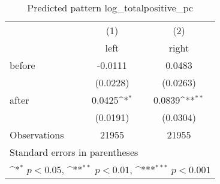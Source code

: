 \begin{table}[htbp]\centering
\def\sym#1{\ifmmode^{#1}\else\(^{#1}\)\fi}
\caption{Predicted pattern log\_totalpositive\_pc}
\begin{tabular}{l*{2}{c}}
\hline\hline
                    &\multicolumn{1}{c}{(1)}&\multicolumn{1}{c}{(2)}\\
                    &\multicolumn{1}{c}{left}&\multicolumn{1}{c}{right}\\
\hline
before              &     -0.0111         &      0.0483         \\
                    &    (0.0228)         &    (0.0263)         \\
[1em]
after               &      0.0425\sym{*}  &      0.0839\sym{**} \\
                    &    (0.0191)         &    (0.0304)         \\
\hline
Observations        &       21955         &       21955         \\
\hline\hline
\multicolumn{3}{l}{\footnotesize Standard errors in parentheses}\\
\multicolumn{3}{l}{\footnotesize \sym{*} \(p<0.05\), \sym{**} \(p<0.01\), \sym{***} \(p<0.001\)}\\
\end{tabular}
\end{table}
